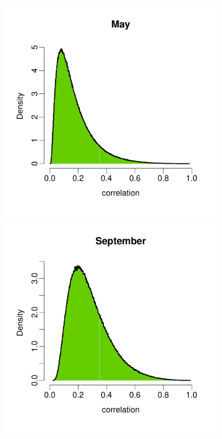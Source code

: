 \documentclass[a4paper, 12pt]{article}
\begin{document}
\begin{figure}
 \includegraphics[width=\scale]{Validation_Plots/Correlation/Correlation_05_May}\hspace{-1ex}
 \includegraphics[width=\scale]{Validation_Plots/Correlation/Correlation_09_Sep}\\[-3ex]

\end{figure}
\end{document}

